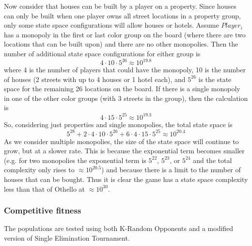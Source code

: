 Now consider that houses can be built by a player on a property. Since houses
can only be built when one player owns all street locations in a property group,
only some state space configurations will allow houses or hotels. Assume
\(Player_{i}\) has a monopoly in the first or last color group on the board
(where there are two locations that can be built upon) and there are no other
monopolies. Then the number of additional state space configurations for either
group is
\begin{equation*}
4 \cdot 10 \cdot 5^{26} \approx 10^{19.8}
\end{equation*}
where 4 is the number of players that could have the monopoly, 10 is the number
of houses (2 streets with up to 4 houses or 1 hotel each), and \(5^{26}\) is the
state space for the remaining 26 locations on the board. If there is a single monopoly
in one of the other color groups (with 3 streets in the group), then the
calculation is
\begin{equation*}
4 \cdot 15 \cdot 5^{25} \approx 10^{19.3}
\end{equation*}
So, considering just properties and single monopolies, the total state space
is
\begin{equation*}
5^{28} + 2 \cdot 4 \cdot 10 \cdot 5^{26} + 6 \cdot 4 \cdot 15 \cdot 5^{25}
\approx 10^{20.4}
\end{equation*}
As we consider multiple monopolies, the size of the state space will continue to
grow, but at a slower rate. This is because the exponential term becomes smaller
(e.g. for two monopolies the exponential term is \(5^{22}\), \(5^{23}\), or
\(5^{24}\) and the total complexity only rises to \(\approx10^{20.5}\)) and
because there is a limit to the number of houses that can be bought. Thus it is
clear the game has a state space complexity less than that of Othello at
\(\approx10^{30}\).

\subsubsection{Competitive fitness} \label{5_compfit}

The populations are tested using both K-Random Opponents and a modified
version of Single Elimination Tournament.

